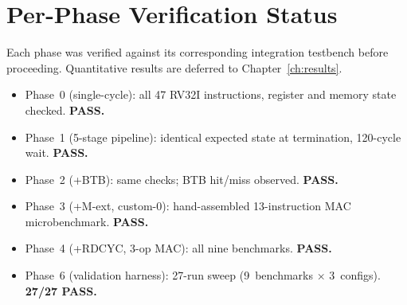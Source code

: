 \section{Per-Phase Verification Status}
Each phase was verified against its corresponding integration testbench
before proceeding. Quantitative results are deferred to
Chapter~\ref{ch:results}.
\begin{itemize}
  \item Phase~0 (single-cycle): all 47 RV32I instructions, register and
        memory state checked. \textbf{PASS.}
  \item Phase~1 (5-stage pipeline): identical expected state at termination,
        120-cycle wait. \textbf{PASS.}
  \item Phase~2 (+BTB): same checks; BTB hit/miss observed. \textbf{PASS.}
  \item Phase~3 (+M-ext, custom-0): hand-assembled 13-instruction MAC
        microbenchmark. \textbf{PASS.}
  \item Phase~4 (+RDCYC, 3-op MAC): all nine benchmarks. \textbf{PASS.}
  \item Phase~6 (validation harness): 27-run sweep
        (9~benchmarks $\times$ 3~configs). \textbf{27/27 PASS.}
\end{itemize}
